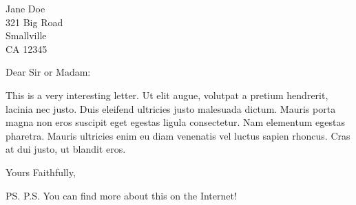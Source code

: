 \documentclass{letter}
\begin{document}
  \begin{letter}{Jane Doe \\ 321 Big Road
\\ Smallville \\ CA 12345}

  \opening{Dear Sir or Madam:}
  
  This is a very interesting letter. Ut elit augue, volutpat a pretium hendrerit, lacinia nec justo. Duis eleifend ultricies justo malesuada dictum. Mauris porta magna non eros suscipit eget egestas ligula consectetur. Nam elementum egestas pharetra. Mauris ultricies enim eu diam venenatis vel luctus sapien rhoncus. Cras at dui justo, ut blandit eros.
  
  \closing{Yours Faithfully,}
  \ps{P.S. You can find more about this on the Internet!}
  \end{letter}
\end{document}
